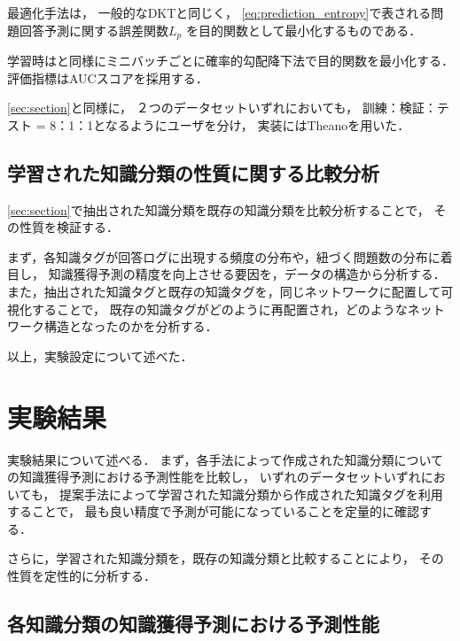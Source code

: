 最適化手法は，
一般的なDKTと同じく，
\ref{eq:prediction_entropy}で表される問題回答予測に関する誤差関数$L_p$
を目的関数として最小化するものである．

学習時は\cite{piech2015deep}と同様にミニバッチごとに確率的勾配降下法で目的関数を最小化する．
評価指標はAUCスコアを採用する．

\ref{sec:section}と同様に，
２つのデータセットいずれにおいても，
訓練：検証：テスト = 8：1：1となるようにユーザを分け，
実装にはTheanoを用いた．


\subsection{学習された知識分類の性質に関する比較分析}

\ref{sec:section}で抽出された知識分類を既存の知識分類を比較分析することで，
その性質を検証する．

まず，各知識タグが回答ログに出現する頻度の分布や，紐づく問題数の分布に着目し，
知識獲得予測の精度を向上させる要因を，データの構造から分析する．
また，抽出された知識タグと既存の知識タグを，同じネットワークに配置して可視化することで，
既存の知識タグがどのように再配置され，どのようなネットワーク構造となったのかを分析する．




以上，実験設定について述べた．



\section{実験結果}
実験結果について述べる．
まず，各手法によって作成された知識分類についての知識獲得予測における予測性能を比較し，
いずれのデータセットいずれにおいても，
提案手法によって学習された知識分類から作成された知識タグを利用することで，
最も良い精度で予測が可能になっていることを定量的に確認する．

さらに，学習された知識分類を，既存の知識分類と比較することにより，
その性質を定性的に分析する．



\subsection{各知識分類の知識獲得予測における予測性能}

